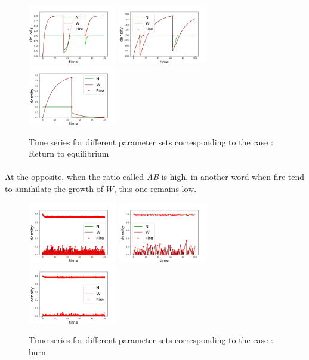 \documentclass{article}
\begin{document}
\begin{figure}[h!]
\centering
\includegraphics[width=3.9cm]{return_to_eq_1.png}
\includegraphics[width=3.9cm]{return_to_eq_2.png}
\includegraphics[width=3.9cm]{return_to_eq_3.png}
\caption{Time series for different parameter sets corresponding to the case : Return to equilibrium}
\end{figure}



\paragraph{}
At the opposite, when the ratio called \textit{AB} is high, in another word when fire tend to annihilate the growth of $W$, this one remains low. 
\begin{figure}[h!]
\centering
\includegraphics[width=3.9cm]{continue_1.png}
\includegraphics[width=3.9cm]{continue_2.png}
\includegraphics[width=3.9cm]{continue_3.png}
\caption{Time series for different parameter sets corresponding to the case : burn}
\end{figure}
\end{document}

